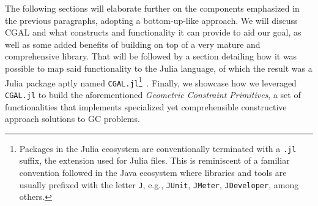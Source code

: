 The following sections will elaborate further on the components emphasized in
the previous paragraphs, adopting a bottom-up-like approach.  We will discuss
\ac{CGAL} and what constructs and functionality it can provide to aid our goal,
as well as some added benefits of building on top of a very mature and
comprehensive library.  That will be followed by a section detailing how it was
possible to map said functionality to the Julia language, of which the result
was a Julia package aptly named \texttt{CGAL.jl}\footnote{Packages in the Julia
ecosystem are conventionally terminated with a \texttt{.jl} suffix, the
extension used for Julia files.  This is reminiscent of a familiar convention
followed in the Java ecosystem where libraries and tools are usually prefixed
with the letter \texttt{J}, e.g., \texttt{JUnit}, \texttt{JMeter},
\texttt{JDeveloper}, among others.}~\cite{Ventura:2021:CGAL.jl}.  Finally, we
showcase how we leveraged \texttt{CGAL.jl} to build the aforementioned
\textit{Geometric Constraint Primitives}, a set of functionalities that implements
specialized yet comprehensible constructive approach solutions to \ac{GC}
problems.




